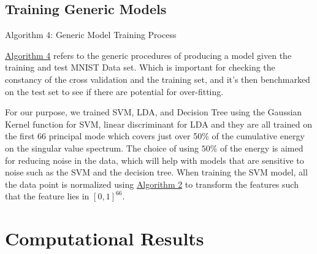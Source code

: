 \documentclass{article}
\begin{document}
    \subsection{Training Generic Models}
        \begin{algorithm}\label{alg:algo4}\scriptsize
            \begin{algorithmic}[1]
            \end{algorithmic}\caption{Algorithm 4: Generic Model Training Process}
        \end{algorithm}
        \hyperref[alg:algo4]{Algorithm 4} refers to the generic procedures of producing a model given the training and test MNIST Data set. Which is important for checking the constancy of the cross validation and the training set, and it's then benchmarked on the test set to see if there are potential for over-fitting. 
        \par
        For our purpose, we trained SVM, LDA, and Decision Tree using the Gaussian Kernel function for SVM, linear discriminant for LDA and they are all trained on the first 66 principal mode which covers just over 50\% of the cumulative energy on the singular value spectrum. The choice of using $50\%$ of the energy is aimed for reducing noise in the data, which will help with models that are sensitive to noise such as the SVM and the decision tree. When training the SVM model, all the data point is normalized using \hyperref[alg:algo2]{Algorithm 2} to transform the features such that the feature lies in $[0, 1]^66$.
 
\section{Computational Results}
\end{document}
